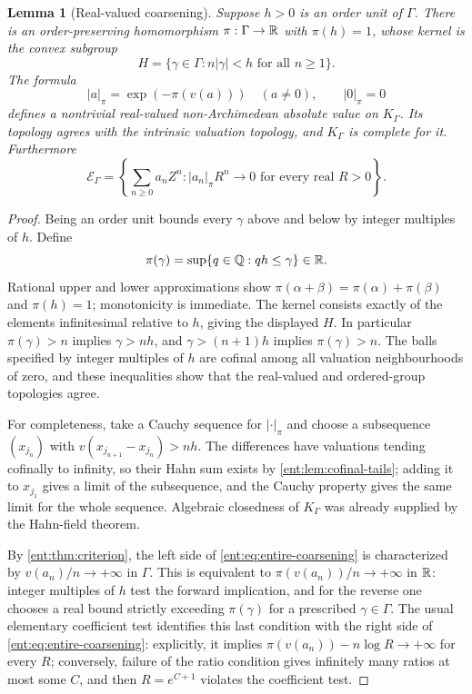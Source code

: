 \documentclass[11pt]{article}
\theoremstyle{plain}
\newtheorem{lemma}[lemma]{Lemma}
\theoremstyle{plain}
\theoremstyle{plain}
\theoremstyle{definition}
\theoremstyle{definition}
\theoremstyle{definition}
\theoremstyle{definition}
\theoremstyle{remark}
\newcommand{\Q}{\mathbb Q}\newcommand{\Z}{\mathbb Z}\newcommand{\N}{\mathbb N}
\newcommand{\K}{K_\Gamma}\newcommand{\KD}{K_\Delta}
\newcommand{\E}{\mathcal E_\Gamma}
\begin{document}
\begin{lemma}[Real-valued coarsening]\label{ent:lem:coarsening}
Suppose $h>0$ is an order unit of $\Gamma$. There is an order-preserving
homomorphism $\pi:\Gamma\to\mathbb R$ with $\pi(h)=1$, whose kernel is the convex
subgroup
\[
 H=\{\gamma\in\Gamma:n|\gamma|<h\text{ for all }n\ge1\}.
\]
The formula
\[
 |a|_\pi=\exp(-\pi(v(a)))\quad(a\ne0),\qquad |0|_\pi=0
\]
defines a nontrivial real-valued non-Archimedean absolute value on $\K$. Its
topology agrees with the intrinsic valuation topology, and $\K$ is complete
for it. Furthermore
\begin{equation}\label{ent:eq:entire-coarsening}
 \E=\left\{\sum_{n\ge0}a_nZ^n:
           |a_n|_\pi R^n\longrightarrow0\text{ for every real }R>0
     \right\}.
\end{equation}
\end{lemma}
\begin{proof}
Being an order unit bounds every $\gamma$ above and below by integer
multiples of $h$. Define
\[
 \pi(\gamma)=\sup\{q\in\Q:qh\le\gamma\}\in\R.
\]
Rational upper and lower approximations show
$\pi(\alpha+\beta)=\pi(\alpha)+\pi(\beta)$ and $\pi(h)=1$; monotonicity is
immediate. The kernel consists exactly of the elements infinitesimal relative
to $h$, giving the displayed $H$. In particular $\pi(\gamma)>n$ implies
$\gamma>nh$, and $\gamma>(n+1)h$ implies $\pi(\gamma)>n$. The balls specified
by integer multiples of $h$ are cofinal among all valuation neighbourhoods of
zero, and these inequalities show that the real-valued and ordered-group
topologies agree.

For completeness, take a Cauchy sequence for $|\cdot|_\pi$ and choose a
subsequence $(x_{j_n})$ with $v(x_{j_{n+1}}-x_{j_n})>nh$. The differences
have valuations tending cofinally to infinity, so their Hahn sum exists by
\cref{ent:lem:cofinal-tails}; adding it to $x_{j_1}$ gives a limit of the
subsequence, and the Cauchy property gives the same limit for the whole
sequence. Algebraic closedness of $\K$ was already supplied by the Hahn-field
theorem.

By \cref{ent:thm:criterion}, the left side of
\eqref{ent:eq:entire-coarsening} is characterized by $v(a_n)/n\to+\infty$ in
$\Gamma$. This is equivalent to $\pi(v(a_n))/n\to+\infty$ in $\mathbb R$: integer
multiples of $h$ test the forward implication, and for the reverse one
chooses a real bound strictly exceeding $\pi(\gamma)$ for a prescribed
$\gamma\in\Gamma$. The usual elementary coefficient test identifies this last
condition with the right side of \eqref{ent:eq:entire-coarsening}:
explicitly, it implies $\pi(v(a_n))-n\log R\to+\infty$ for every $R$;
conversely, failure of the ratio condition gives infinitely many ratios at
most some $C$, and then $R=e^{C+1}$ violates the coefficient test.
\end{proof}
\end{document}
